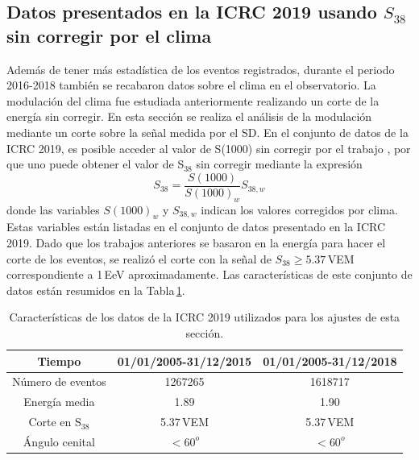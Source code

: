 \subsection{Datos presentados en la ICRC 2019 usando $S_{38}$ sin corregir por el clima}

Además de tener más estadística de los eventos registrados, durante el periodo 2016-2018 también se recabaron datos sobre el clima en el observatorio. La modulación del clima fue estudiada anteriormente realizando un corte de la energía sin corregir. En esta sección se realiza el análisis de la modulación mediante un  corte sobre la señal medida por el SD. En el conjunto de datos de la ICRC 2019, es posible acceder al valor de S(1000) sin corregir por el trabajo \cite{aab2017impact}, por que uno puede obtener el valor de S$_{38}$ sin corregir mediante la expresión
\begin{equation}
    S_{38} = \frac{S(1000)}{S(1000)_w}S_{38,w}
    \label{eq:s38_w}
\end{equation}
donde las variables $S(1000)_w$ y $S_{38,w}$ indican los valores corregidos por clima. Estas variables están listadas en el conjunto de datos presentado en la ICRC 2019. Dado que los trabajos anteriores se basaron en la energía para hacer el corte de los eventos, se realizó el corte con la señal de $S_{38}\ge 5.37\,$VEM correspondiente a 1\,EeV aproximadamente. %
Las características de este conjunto de datos están resumidos en la Tabla\,\ref{tabla:caracteristicas_ICRC_2019_S38}.
        \begin{table}[H]
            \centering
            \begin{tabular}{|c|c|c|}
            \hline
            \textbf{Tiempo }    & \textbf{01/01/2005-31/12/2015}  & \textbf{01/01/2005-31/12/2018 }\\ \hline 
            Número de eventos   &   1267265     		 &  1618717     		\\ \hline 
            Energía media       &  1.89        		 	 &  1.90        		\\ \hline 
            Corte en S$_{38}$ 	    &  5.37\,VEM   		 	 &  5.37\,VEM       	\\ \hline 
            Ángulo cenital 		&  $<60^o$ 			 	 & $<60^o$\\ \hline
            \end{tabular}
            \caption{Características de los datos de la ICRC 2019 utilizados para los ajustes de esta sección.} \label{tabla:caracteristicas_ICRC_2019_S38}
        \end{table}

